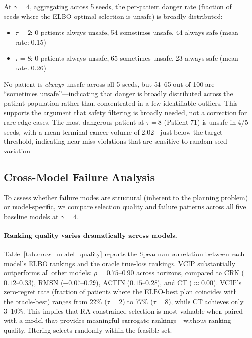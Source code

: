 \documentclass{article}
\begin{document}
At $\gamma{=}4$, aggregating across 5 seeds, the per-patient danger rate (fraction of seeds where the ELBO-optimal selection is unsafe) is broadly distributed:

\begin{itemize}
    \item $\tau{=}2$: 0 patients always unsafe, 54 sometimes unsafe, 44 always safe (mean rate: 0.15).
    \item $\tau{=}8$: 0 patients always unsafe, 65 sometimes unsafe, 23 always safe (mean rate: 0.26).
\end{itemize}

No patient is \emph{always} unsafe across all 5 seeds, but 54--65 out of 100 are ``sometimes unsafe''---indicating that danger is broadly distributed across the patient population rather than concentrated in a few identifiable outliers. This supports the argument that safety filtering is broadly needed, not a correction for rare edge cases. The most dangerous patient at $\tau{=}8$ (Patient 71) is unsafe in 4/5 seeds, with a mean terminal cancer volume of 2.02---just below the target threshold, indicating near-miss violations that are sensitive to random seed variation.

\subsection{Cross-Model Failure Analysis}
\label{app:cross_model}

To assess whether failure modes are structural (inherent to the planning problem) or model-specific, we compare selection quality and failure patterns across all five baseline models at $\gamma = 4$.

\paragraph{Ranking quality varies dramatically across models.} Table~\ref{tab:cross_model_quality} reports the Spearman correlation between each model's ELBO rankings and the oracle true-loss rankings. VCIP substantially outperforms all other models: $\rho = 0.75$--$0.90$ across horizons, compared to CRN ($0.12$--$0.33$), RMSN ($-0.07$--$0.29$), ACTIN ($0.15$--$0.28$), and CT ($\approx 0.00$). VCIP's zero-regret rate (fraction of patients where the ELBO-best plan coincides with the oracle-best) ranges from 22\% ($\tau{=}2$) to 77\% ($\tau{=}8$), while CT achieves only 3--10\%. This implies that RA-constrained selection is most valuable when paired with a model that provides meaningful surrogate rankings---without ranking quality, filtering selects randomly within the feasible set.
\end{document}

